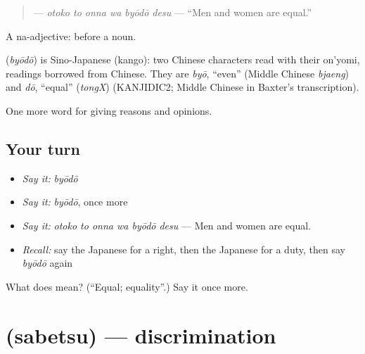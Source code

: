 \begin{quote}
\textbf{  } — \emph{otoko to onna wa byōdō desu} — \textquotedblleft{}Men and women are equal.\textquotedblright{}
\end{quote}

A na-adjective:  before a noun.

\begin{cousinweb}
\textbf{} (\emph{byōdō}) is Sino-Japanese (kango): two Chinese characters read with their on'yomi, readings borrowed from Chinese. They are \emph{byō}, \textquotedblleft{}even\textquotedblright{} (Middle Chinese \emph{bjaeng}) and \emph{dō}, \textquotedblleft{}equal\textquotedblright{} (\emph{tongX}) (KANJIDIC2; Middle Chinese in Baxter's transcription).
\end{cousinweb}

\begin{grammarlens}[title={What you've built}]
One more word for giving reasons and opinions.
\end{grammarlens}

\subsection*{Your turn}
\begin{itemize}
\raggedright
  \item \emph{Say it:} \emph{byōdō}
  \item \emph{Say it:} \emph{byōdō}, once more
  \item \emph{Say it:} \emph{otoko to onna wa byōdō desu} — Men and women are equal.
  \item \emph{Recall:} say the Japanese for a right, then the Japanese for a duty, then say \emph{byōdō} again
\end{itemize}

\begin{tcolorbox}[breakable,colback=teal!4,colframe=teal!35!black,title={Before you move on}]
What does  mean? (\textquotedblleft{}Equal; equality\textquotedblright{}.) Say it once more.
\end{tcolorbox}
\section[\texorpdfstring{\ja{さべつ} (sabetsu)}{さべつ (sabetsu)}]{ (sabetsu) — discrimination}

\label{lesson:JA-C332-sabetsu}



